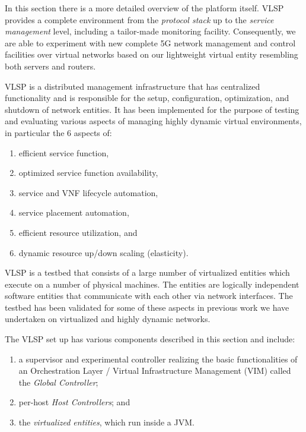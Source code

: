 
In this section there is a more detailed overview of the platform
itself.
VLSP provides a complete environment from the
\emph{protocol stack} up to the \emph{service management} level,
including a tailor-made monitoring facility. Consequently, we are able to
experiment with new complete 5G network management and control
facilities over virtual networks based on our lightweight virtual
entity resembling both servers and routers.

 VLSP is a distributed management
infrastructure that has centralized functionality and is
responsible for the setup, configuration, optimization, and shutdown
of network entities.
 It has been implemented for the
purpose of testing and evaluating various aspects of managing  highly dynamic virtual
environments, in particular  the 6 aspects of:

\begin{adjustwidth}{\parindent}{}
\begin{enumerate}[label=(\roman*),noitemsep]
\item efficient service function,
\item optimized service function availability,
\item service and VNF lifecycle automation,
\item service placement automation,
\item efficient resource utilization, and
\item  dynamic resource up/down scaling (elasticity).
\end{enumerate}
\end{adjustwidth}

\noindent VLSP is a testbed that consists of a large number of virtualized entities which
execute on a number of physical machines.
The entities are logically independent software entities that
communicate with each other via network interfaces. 
The testbed has been validated
for some of these aspects in previous work we have undertaken on
virtualized and highly dynamic networks.

The VLSP set up has various components described in this section
and include:

\begin{adjustwidth}{\parindent}{}
\begin{enumerate}[label=(\roman*),noitemsep]
\item a supervisor and experimental
controller realizing the basic functionalities of an Orchestration
Layer  / Virtual Infrastructure Management (VIM) called the  \textit{Global Controller};

\item per-host \emph{Host Controllers};  and

\item the \emph{virtualized entities}, which run inside a JVM.
\end{enumerate}
\end{adjustwidth}

